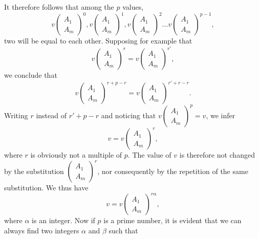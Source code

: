 \documentclass[oneside, 12 pt, leqno]{memoir}
\begin{document}
It therefore follows that among the \(p\) values,
\[v\left(\begin{array}{l}A_1 \\A_m\end{array}\right)^0, v\left(\begin{array}{l}A_1 \\A_m\end{array}\right)^1, v\left(\begin{array}{l}A_1 \\A_m\end{array}\right)^2 \dots v\left(\begin{array}{l}A_1 \\A_m\end{array}\right)^{p-1},\]
two will be equal to each other.  Supposing for example that
\[v\left(\begin{array}{l}A_1 \\A_m\end{array}\right)^r=v\left(\begin{array}{l}A_1 \\A_m\end{array}\right)^{r'},\]
we conclude that
\[v\left(\begin{array}{l}A_1 \\A_m\end{array}\right)^{r+p-r}=v\left(\begin{array}{l}A_1 \\A_m\end{array}\right)^{r'+r-r}.\]
Writing \(r\) instead of \(r'+p-r\) and noticing that \(v\left(\begin{array}{l}A_1 \\ A_m\end{array}\right)^p=v\), we infer
\[v=v\left(\begin{array}{l}A_1 \\A_{m}\end{array}\right)^r,\]
where \(r\) is obviously not a multiple of \(p\). The value of \(v\) is therefore not changed by the substitution \(\left(\begin{array}{l}A_1 \\ A_m\end{array}\right)^r\), nor consequently by the repetition of the same substitution. We thus have
\[v=v\left(\begin{array}{l}A_1 \\A_m\end{array}\right)^{r \alpha},\]
where \(\alpha\) is an integer. Now if \(p\) is a prime number, it is evident that we can always find two integers \(\alpha\) and \(\beta\) such that
\end{document}
